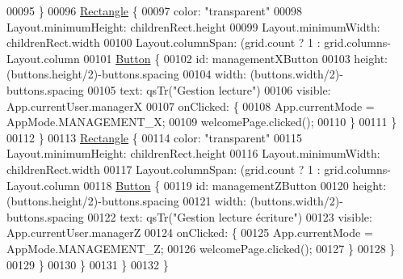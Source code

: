 \begin{DoxyCode}
00095             \}
00096             \hyperlink{classRectangle}{Rectangle} \{
00097                 color: \textcolor{stringliteral}{"transparent"}
00098                 Layout.minimumHeight: childrenRect.height
00099                 Layout.minimumWidth: childrenRect.width
00100                 Layout.columnSpan: (grid.count%
      ? 1 : grid.columns-Layout.column
00101                 \hyperlink{classButton}{Button} \{
00102                     \textcolor{keywordtype}{id}: managementXButton
00103                     height: (buttons.height/2)-buttons.spacing
00104                     width: (buttons.width/2)-buttons.spacing
00105                     text: qsTr(\textcolor{stringliteral}{"Gestion lecture"})
00106                     visible: App.currentUser.managerX
00107                     onClicked: \{
00108                         App.currentMode = AppMode.MANAGEMENT\_X;
00109                         welcomePage.clicked();
00110                     \}
00111                 \}
00112             \}
00113             \hyperlink{classRectangle}{Rectangle} \{
00114                 color: \textcolor{stringliteral}{"transparent"}
00115                 Layout.minimumHeight: childrenRect.height
00116                 Layout.minimumWidth: childrenRect.width
00117                 Layout.columnSpan: (grid.count%
      ? 1 : grid.columns-Layout.column
00118                 \hyperlink{classButton}{Button} \{
00119                     \textcolor{keywordtype}{id}: managementZButton
00120                     height: (buttons.height/2)-buttons.spacing
00121                     width: (buttons.width/2)-buttons.spacing
00122                     text: qsTr(\textcolor{stringliteral}{"Gestion lecture écriture"})
00123                     visible: App.currentUser.managerZ
00124                     onClicked: \{
00125                         App.currentMode = AppMode.MANAGEMENT\_Z;
00126                         welcomePage.clicked();
00127                     \}
00128                 \}
00129             \}
00130         \}
00131     \}
00132 \}
\end{DoxyCode}
